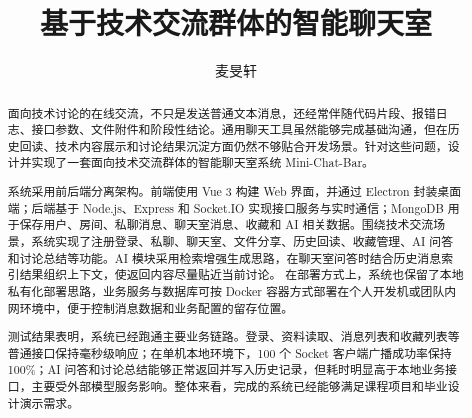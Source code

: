 \documentclass[twoside]{thesis-cls-Miya}
\begin{document}
\title{基于技术交流群体的智能聊天室}

\author{麦旻轩}


\maketitle

\frontmatter

\begin{abstract}
面向技术讨论的在线交流，不只是发送普通文本消息，还经常伴随代码片段、报错日志、接口参数、文件附件和阶段性结论。通用聊天工具虽然能够完成基础沟通，但在历史回读、技术内容展示和讨论结果沉淀方面仍然不够贴合开发场景。针对这些问题，设计并实现了一套面向技术交流群体的智能聊天室系统 Mini-Chat-Bar。

系统采用前后端分离架构。前端使用 Vue 3 构建 Web 界面，并通过 Electron 封装桌面端；后端基于 Node.js、Express 和 Socket.IO 实现接口服务与实时通信；MongoDB 用于保存用户、房间、私聊消息、聊天室消息、收藏和 AI 相关数据。围绕技术交流场景，系统实现了注册登录、私聊、聊天室、文件分享、历史回读、收藏管理、AI 问答和讨论总结等功能。AI 模块采用检索增强生成思路，在聊天室问答时结合历史消息索引结果组织上下文，使返回内容尽量贴近当前讨论。
在部署方式上，系统也保留了本地私有化部署思路，业务服务与数据库可按 Docker 容器方式部署在个人开发机或团队内网环境中，便于控制消息数据和业务配置的留存位置。

测试结果表明，系统已经跑通主要业务链路。登录、资料读取、消息列表和收藏列表等普通接口保持毫秒级响应；在单机本地环境下，100 个 Socket 客户端广播成功率保持 100\%；AI 问答和讨论总结能够正常返回并写入历史记录，但耗时明显高于本地业务接口，主要受外部模型服务影响。整体来看，完成的系统已经能够满足课程项目和毕业设计演示需求。

\end{abstract}
\end{document}
